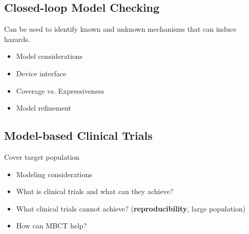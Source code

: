 \documentclass[a4paper]{article}
\begin{document}
\subsection{Closed-loop Model Checking}
Can be used to identify known and unknown mechanisms that can induce hazards.
\begin{itemize}
	\item  Model considerations
	\item Device interface
	\item Coverage vs. Expressiveness
	\item Model refinement
\end{itemize}

\subsection{Model-based Clinical Trials}
Cover target population

\begin{itemize}
	\item Modeling considerations
	\item What is clinical trials and what can they achieve?
	\item What clinical trials cannot achieve? (\textbf{reproducibility}, large population)
	\item How can MBCT help?
\end{itemize}


\end{document}
